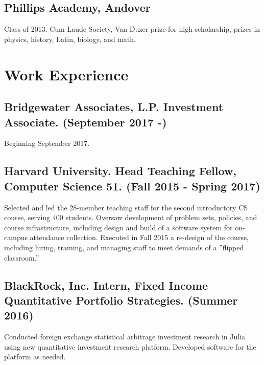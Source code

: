 \documentclass[letterpaper]{amsart}
\renewenvironment{itemize}{
  \begin{list}{}{
    \setlength{\leftmargin}{1.5em}
  }
}{
  \end{list}
}
\begin{document}
\subsection*{Phillips Academy, Andover}
\begin{itemize}
  \item Class of 2013. Cum Laude Society, Van Duzer prize for high scholarship, prizes in physics, history, Latin, biology, and math.  
\end{itemize}

\section*{Work Experience}

\subsection*{Bridgewater Associates, L.P. Investment Associate. (September 2017 -) }
\begin{itemize}
\item Beginning September 2017.
\end{itemize}

\subsection*{Harvard University. Head Teaching Fellow, Computer Science 51. (Fall 2015 - Spring 2017)}
\begin{itemize}
\item
Selected and led the 28-member teaching staff for the second introductory CS course, serving 400 students. Oversaw
development of problem sets, policies, and course infrastructure, including design and build of a software
system for on-campus attendance collection. Executed in Fall 2015 a re-design of the course,
including hiring, training, and managing staff to meet demands of a ''flipped classroom.''
\end{itemize}

\subsection*{BlackRock, Inc. Intern, Fixed Income Quantitative Portfolio Strategies. (Summer 2016)} 
\begin{itemize}
\item Conducted foreign exchange statistical arbitrage investment research in Julia using new quantitative investment research platform. 
Developed software for the platform as needed. 
\end{itemize}
\end{document}
